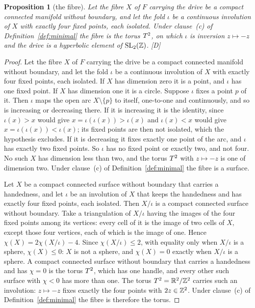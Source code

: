 \documentclass[11pt,a4paper]{article}
\theoremstyle{plain}
\newtheorem{proposition}[theorem]{Proposition}
\theoremstyle{definition}
\theoremstyle{remark}
\newcommand{\rigD}{[\textup{D}]}
\begin{document}
\begin{proposition}[the fibre]\label{prop:surface}
Let the fibre $X$ of $F$ carrying the drive be a compact connected manifold without boundary, and let the fold $\iota$ be a continuous involution of $X$ with exactly four fixed points, each isolated. Under clause~(c) of Definition~\ref{def:minimal} the fibre is the torus $T^2$, on which $\iota$ is inversion $z\mapsto-z$ and the drive is a hyperbolic element of $\mathrm{SL}_{2}(\mathbb{Z})$. \rigD
\end{proposition}

\begin{proof}
Let the fibre $X$ of $F$ carrying the drive be a compact connected manifold without boundary, and let the fold $\iota$ be a continuous involution of $X$ with exactly four fixed points, each isolated. If $X$ has dimension zero it is a point, and $\iota$ has one fixed point. If $X$ has dimension one it is a circle. Suppose $\iota$ fixes a point $p$ of it. Then $\iota$ maps the open arc $X\setminus\{p\}$ to itself, one-to-one and continuously, and so is increasing or decreasing there. If it is increasing it is the identity, since $\iota(x)>x$ would give $x=\iota(\iota(x))>\iota(x)$ and $\iota(x)<x$ would give $x=\iota(\iota(x))<\iota(x)$; its fixed points are then not isolated, which the hypothesis excludes. If it is decreasing it fixes exactly one point of the arc, and $\iota$ has exactly two fixed points. So $\iota$ has no fixed point or exactly two, and not four. No such $X$ has dimension less than two, and the torus $T^2$ with $z\mapsto-z$ is one of dimension two. Under clause~(c) of Definition~\ref{def:minimal} the fibre is a surface.

Let $X$ be a compact connected surface without boundary that carries a handedness, and let $\iota$ be an involution of $X$ that keeps the handedness and has exactly four fixed points, each isolated. Then $X/\iota$ is a compact connected surface without boundary. Take a triangulation of $X/\iota$ having the images of the four fixed points among its vertices: every cell of it is the image of two cells of $X$, except those four vertices, each of which is the image of one. Hence $\chi(X)=2\chi(X/\iota)-4$. Since $\chi(X/\iota)\le2$, with equality only when $X/\iota$ is a sphere, $\chi(X)\le0$: $X$ is not a sphere, and $\chi(X)=0$ exactly when $X/\iota$ is a sphere. A compact connected surface without boundary that carries a handedness and has $\chi=0$ is the torus $T^2$, which has one handle, and every other such surface with $\chi<0$ has more than one. The torus $T^2=\mathbb{R}^{2}/\mathbb{Z}^{2}$ carries such an involution: $z\mapsto-z$ fixes exactly the four points with $2z\in\mathbb{Z}^{2}$. Under clause~(c) of Definition~\ref{def:minimal} the fibre is therefore the torus.


\end{proof}
\end{document}
